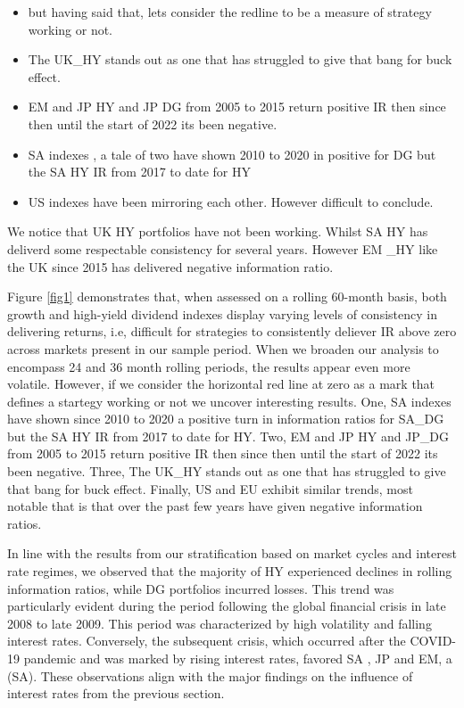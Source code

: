 \documentclass[12pt,preprint, authoryear]{elsarticle}
\numberwithin{equation}{section}
\numberwithin{figure}{section}
\numberwithin{table}{section}
\def\tightlist{} %
\begin{document}
\begin{itemize}
\tightlist
\item
  but having said that, lets consider the redline to be a measure of
  strategy working or not.
\item
  The UK\_HY stands out as one that has struggled to give that bang for
  buck effect.
\item
  EM and JP HY and JP DG from 2005 to 2015 return positive IR then since
  then until the start of 2022 its been negative.
\item
  SA indexes , a tale of two have shown 2010 to 2020 in positive for DG
  but the SA HY IR from 2017 to date for HY
\item
  US indexes have been mirroring each other. However difficult to
  conclude.
\end{itemize}

We notice that UK HY portfolios have not been working. Whilst SA HY has
deliverd some respectable consistency for several years. However EM \_HY
like the UK since 2015 has delivered negative information ratio.

Figure \ref{fig1} demonstrates that, when assessed on a rolling 60-month
basis, both growth and high-yield dividend indexes display varying
levels of consistency in delivering returns, i.e, difficult for
strategies to consistently deliever IR above zero across markets present
in our sample period. When we broaden our analysis to encompass 24 and
36 month rolling periods, the results appear even more volatile.
However, if we consider the horizontal red line at zero as a mark that
defines a startegy working or not we uncover interesting results. One,
SA indexes have shown since 2010 to 2020 a positive turn in information
ratios for SA\_DG but the SA HY IR from 2017 to date for HY. Two, EM and
JP HY and JP\_DG from 2005 to 2015 return positive IR then since then
until the start of 2022 its been negative. Three, The UK\_HY stands out
as one that has struggled to give that bang for buck effect. Finally, US
and EU exhibit similar trends, most notable that is that over the past
few years have given negative information ratios.

In line with the results from our stratification based on market cycles
and interest rate regimes, we observed that the majority of HY
experienced declines in rolling information ratios, while DG portfolios
incurred losses. This trend was particularly evident during the period
following the global financial crisis in late 2008 to late 2009. This
period was characterized by high volatility and falling interest rates.
Conversely, the subsequent crisis, which occurred after the COVID-19
pandemic and was marked by rising interest rates, favored SA , JP and
EM, a (SA). These observations align with the major findings on the
influence of interest rates from the previous section.
\end{document}
